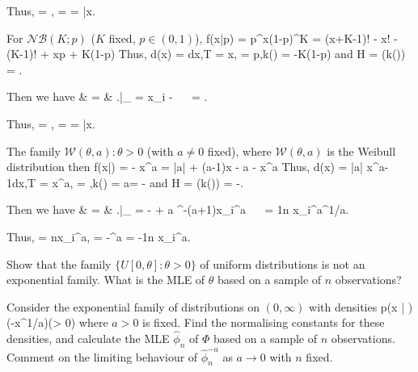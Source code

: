 Thus,
\be
\hat{\phi} = \log {},\quad\quad {} =  = \bar{x}.
\ee

\item [(f)] For $\mathcal{NB}(K; p)$ ($K$ fixed, $p \in (0, 1)$),
\be
f(x|p) =  p^x(1-p)^K = \exp \lob \log (x+K-1)! - \log x! - \log (K-1)! + x\log p + K\log (1-p)\rob
\ee
Thus,
\be
d\mu(x) =  dx,\quad\quad T = x, \quad\quad \phi = \log p,\quad \quad k(\phi) = -K\log (1-p)
\ee
and
\be
H = \nabla (k(\phi)) = .
\ee

Then we have
 & = & \left.\right|_{} =  \sum x_i -   \ \ra \  = .
\eeast

Thus,
\be
\hat{\phi} = \log {},\quad\quad {} =  = \bar{x}.
\ee

\item [(g)] The family ${\mathcal{W}(\theta, a) : \theta > 0}$ (with $a\neq 0$ fixed), where $\mathcal{W}(\theta, a)$ is the Weibull distribution then
\be
f(x|\theta) =  \exp\lob - \lob \frac x{\theta}\rob^a \rob = \exp\lob  \log |a| + (a-1)\log x - a \log\theta  - \lob \frac x{\theta}\rob^a \rob
\ee
Thus,
\be
d\mu(x) = |a| x^{a-1}dx,\quad\quad T = x^a, \quad\quad \phi = ,\quad \quad k(\phi) = a\log \theta = -\log \phi
\ee
and
\be
H = \nabla (k(\phi)) = -.
\ee

Then we have
 & = & \left.\frac{\partial \ell}{\partial \theta}\right|_{\hat{\theta}} = -  + a \hat{\theta}^{-(a+1)}\sum x_i^a \ \ra \ \hat{\theta} = \lob \frac 1n \sum x_i^a\rob^{1/a}.
\eeast

Thus,
\be
\hat{\phi} = \frac n{\sum x_i^a},\quad\quad {} = -\hat{\theta}^a = -\frac 1n \sum x_i^a.
\ee

\een





\item
\ben
\item [(a)] Show that the family $\{U[0, \theta] : \theta > 0\}$ of uniform distributions is not an exponential family. What is the MLE of $\theta$ based on a sample of $n$ observations?

\item [(b)] Consider the exponential family of distributions on $(0,\infty)$ with densities
\be
p(x | \phi ) \propto \exp(-\phi x^{1/a})\quad (\phi  > 0)
\ee
where $a > 0$ is fixed. Find the normalising constants for these densities, and calculate the MLE $\hat{\phi}_n$ of $\Phi$ based on a sample of $n$ observations. Comment on the limiting behaviour of $\hat{\phi}^{-a}_n$ as $a \to 0$ with $n$ fixed.
\een



